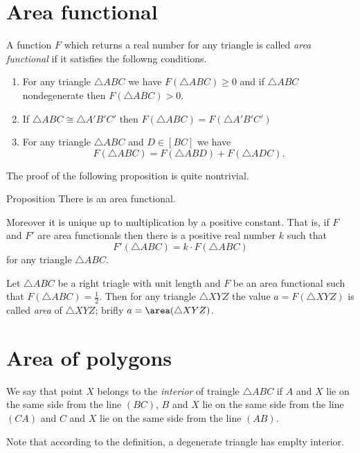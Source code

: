 {\section*{Area functional}

A function $F$ which returns a real number 
for any triangle is called \emph{area functional} if it satisfies the followng conditions.

\begin{enumerate}
\item For any triangle $\triangle ABC$ we have $F(\triangle ABC)\ge 0$ and 
if  $\triangle ABC$ nondegenerate then $F(\triangle ABC)>0$.
\item If $\triangle ABC\cong\triangle A'B'C'$ 
 then $F(\triangle ABC)=F(\triangle A'B'C')$
\item For any triangle $ \triangle ABC$ and $D\in [BC]$ we have
$$F(\triangle ABC)=F(\triangle ABD)+F(\triangle ADC).$$
\end{enumerate}

The proof of the following proposition is quite nontrivial.

\begin{thm}{Proposition}
There is an area functional. 

Moreover it is unique up to multiplication by a positive constant. 
That is, if $F$ and $F'$ are area functionals then there is a positive real number $k$ such that 
\[F'(\triangle ABC)=k\cdot F(\triangle ABC)\]
for any triangle $\triangle ABC$.
\end{thm}

Let $\triangle ABC$ be a right triagle with unit length
and $F$ be an area functional such that $F(\triangle ABC)=\tfrac12$.
Then for any triangle $\triangle XYZ$ the value $a=F(\triangle XYZ)$ is called \emph{area} of $\triangle XYZ$;
brifly $a=\area(\triangle XYZ)$.






\section*{Area of polygons}

We say that point $X$ belongs to the \emph{interior} of traingle $\triangle ABC$
if $A$ and $X$ lie on the same side from the line $(BC)$,
$B$ and $X$ lie on the same side from the line $(CA)$
and 
$C$ and $X$ lie on the same side from the line $(AB)$.

Note that according to the definition,
a degenerate triangle has emplty interior.

}
